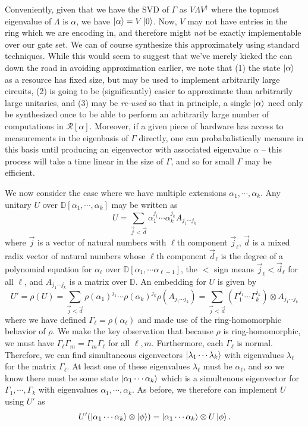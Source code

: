 \documentclass{article}
\theoremstyle{definition}
\theoremstyle{theorem}
\theoremstyle{remark}
\begin{document}
	Conveniently, given that we have the SVD of $\Gamma$ as $V\Lambda V^\dagger$ where the topmost eigenvalue of $\Lambda$ is $\alpha$, we have $\ket{\alpha} = V \ket{0}$. Now, $V$ may not have entries in the ring which we are encoding in, and therefore might \emph{not} be exactly implementable over our gate set. We can of course synthesize this approximately using standard techniques. While this would seem to suggest that we've merely kicked the can down the road in avoiding approximation earlier, we note that (1) the state $\ket{\alpha}$ as a resource has fixed size, but may be used to implement arbitrarily large circuits, (2) is going to be (significantly) easier to approximate than arbitrarily large unitaries, and (3) may be \emph{re-used} so that in principle, a single $\ket{\alpha}$ need only be synthesized once to be able to perform an arbitrarily large number of computations in $\mathcal{R}[\alpha]$. Moreover, if a given piece of hardware has access to measurements in the eigenbasis of $\Gamma$ directly, one can probabalistically measure in this basis until producing an eigenvector with associated eigenvalue $\alpha$ -- this process will take a time linear in the size of $\Gamma$, and so for small $\Gamma$ may be efficient.
	
	We now consider the case where we have multiple extensions $\alpha_1,\cdots,\alpha_k$. Any unitary $U$ over $\mathbb{D}[\alpha_1,\cdots,\alpha_k]$ may be written as
	\[
		U = \sum_{\vec{j}<\vec{d}}\alpha_1^{j_1}\cdots \alpha_k^{j_k} A_{j_1\cdots j_k}
	\]
	where $\vec{j}$ is a vector of natural numbers with $\ell$th component $\vec{j}_\ell$, $\vec{d}$ is a mixed radix vector of natural numbers whose $\ell$th component $\vec{d}_\ell$ is the degree of a polynomial equation for $\alpha_\ell$ over $\mathbb{D}[\alpha_1,\cdots \alpha_{\ell-1}]$, the $<$ sign means $\vec{j}_\ell<\vec{d}_\ell$ for all $\ell$, and $A_{j_1\cdots j_k}$ is a matrix over $\mathbb{D}$. An embedding for $U$ is given by
	\[
		U' = \rho(U) =  \sum_{\vec{j}<\vec{d}}\rho(\alpha_1)^{j_1}\cdots \rho(\alpha_k)^{j_k} \rho(A_{j_1\cdots j_k}) =  \sum_{\vec{j}<\vec{d}}(\Gamma_1^{j_1}\cdots \Gamma_k^{j_k})\otimes A_{j_1\cdots j_k}
	\]
	where we have defined $\Gamma_\ell = \rho(\alpha_\ell)$ and made use of the ring-homomorphic behavior of $\rho$. We make the key observation that because $\rho$ is ring-homomorphic, we must have $\Gamma_\ell \Gamma_m = \Gamma_m \Gamma_\ell$ for all $\ell, m$. Furthermore, each $\Gamma_\ell$ is normal. Therefore, we can find simultaneous eigenvectors $\ket{\lambda_1\cdots \lambda_k}$ with eigenvalues $\lambda_\ell$ for the matrix $\Gamma_\ell$. At least one of these eigenvalues $\lambda_\ell$ must be $\alpha_\ell$, and so we know there must be some state $\ket{\alpha_1\cdots \alpha_k}$ which is a simultenous eigenvector for $\Gamma_1, \cdots, \Gamma_k$ with eigenvalues $\alpha_1,\cdots,\alpha_k$. As before, we therefore can implement $U$ using $U'$ as
	\[
		U' (\ket{\alpha_1\cdots\alpha_k}\otimes \ket{\phi}) = \ket{\alpha_1\cdots\alpha_k}\otimes U \ket{\phi}.
	\]
 
\end{document}
